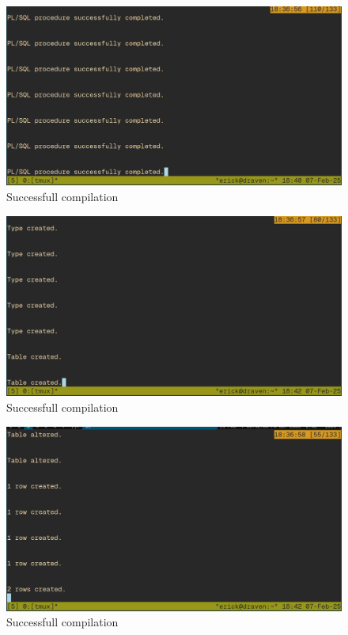 \documentclass{article}
\begin{document}
\begin{figure}[H]
	\centering
	\includegraphics[width=1\textwidth]{imgs/p2.png}
	\caption{Successfull compilation}
	\label{fig:21}
\end{figure}

\begin{figure}[H]
	\centering
	\includegraphics[width=1\textwidth]{imgs/p3.png}
	\caption{Successfull compilation}
	\label{fig:22}
\end{figure}

\begin{figure}[H]
	\centering
	\includegraphics[width=1\textwidth]{imgs/p4.png}
	\caption{Successfull compilation}
	\label{fig:23}
\end{figure}
\end{document}
